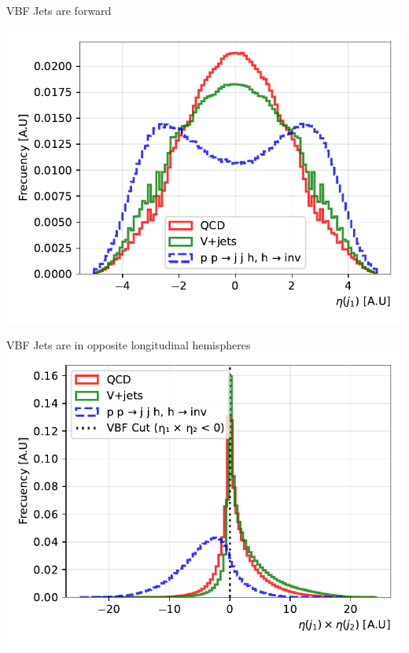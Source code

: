 \documentclass{../../bredelebeamer}
\begin{document}
\begin{frame}{VBF Jets are forward}
    \begin{minipage}{0.97\textwidth}
        \includegraphics[width=\textwidth]{../Images/leading_jet_eta_comparison.pdf}
    \end{minipage}
\end{frame}

\begin{frame}{VBF Jets are in opposite longitudinal hemispheres}
    \includegraphics[width=\textwidth]{../Images/eta_product_comparison.pdf}
\end{frame}
\end{document}
